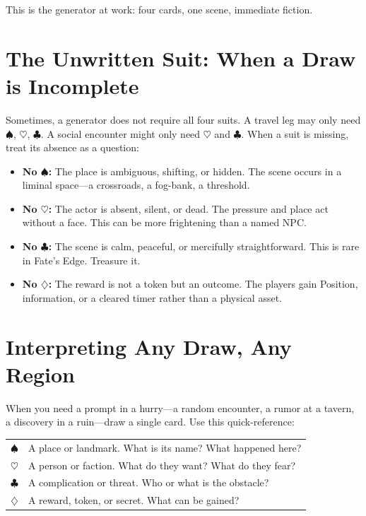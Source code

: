\documentclass[11pt,letterpaper,twoside]{book}
\begin{document}
This is the generator at work: four cards, one scene, immediate fiction.

\section*{The Unwritten Suit: When a Draw is Incomplete}

Sometimes, a generator does not require all four suits. A travel leg may only need $\spadesuit$, $\heartsuit$, $\clubsuit$. A social encounter might only need $\heartsuit$ and $\clubsuit$. When a suit is missing, treat its absence as a question:

\begin{itemize}
    \item \textbf{No $\spadesuit$:} The place is ambiguous, shifting, or hidden. The scene occurs in a liminal space---a crossroads, a fog-bank, a threshold.
    \item \textbf{No $\heartsuit$:} The actor is absent, silent, or dead. The pressure and place act without a face. This can be more frightening than a named NPC.
    \item \textbf{No $\clubsuit$:} The scene is calm, peaceful, or mercifully straightforward. This is rare in Fate's Edge. Treasure it.
    \item \textbf{No $\diamondsuit$:} The reward is not a token but an outcome. The players gain Position, information, or a cleared timer rather than a physical asset.
\end{itemize}

\section*{Interpreting Any Draw, Any Region}

When you need a prompt in a hurry---a random encounter, a rumor at a tavern, a discovery in a ruin---draw a single card. Use this quick-reference:

\begin{center}
\begin{tabular}{|l|l|}
\hline
$\spadesuit$ & A place or landmark. What is its name? What happened here? \\
$\heartsuit$ & A person or faction. What do they want? What do they fear? \\
$\clubsuit$ & A complication or threat. Who or what is the obstacle? \\
$\diamondsuit$ & A reward, token, or secret. What can be gained? \\
\hline
\end{tabular}
\end{center}
\end{document}

